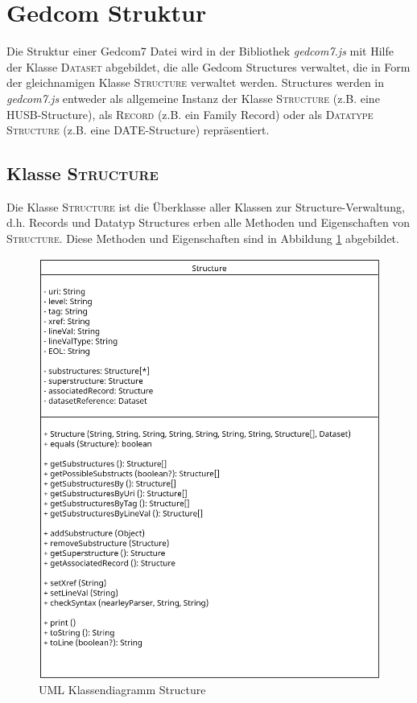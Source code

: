 \section{Gedcom Struktur}
\label{sec: Implementierung - Gedcom Struktur}
Die Struktur einer Gedcom7 Datei wird in der Bibliothek \textit{gedcom7.js} mit Hilfe der Klasse \textsc{Dataset} abgebildet, die alle Gedcom Structures verwaltet, die in Form der gleichnamigen Klasse \textsc{Structure} verwaltet werden. Structures werden in \textit{gedcom7.js} entweder als allgemeine Instanz der Klasse \textsc{Structure} (z.B. eine HUSB-Structure), als \textsc{Record} (z.B. ein Family Record) oder als \textsc{Datatype Structure} (z.B. eine DATE-Structure) repräsentiert. 

\subsection{Klasse \textsc{Structure}}
\label{subsec: Implementierung - Gedcom Struktur - Klasse Structure}
Die Klasse \textsc{Structure} ist die Überklasse aller Klassen zur Structure-Verwaltung, d.h. Records und Datatyp Structures erben alle Methoden und Eigenschaften von \textsc{Structure}. Diese Methoden und Eigenschaften sind in Abbildung \ref{fig: UML Klassendiagramm Structure} abgebildet. 

\begin{figure}[h]
	\centering
	\includegraphics[width=1\textwidth]{images/UML_Class_Structure.png}
	\caption{UML Klassendiagramm Structure}
	\label{fig: UML Klassendiagramm Structure}
\end{figure}

